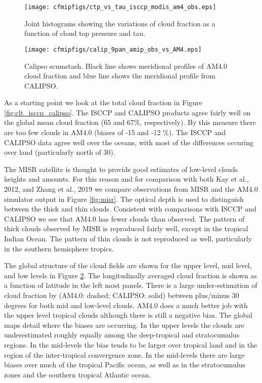 \documentclass[11pt]{article}   	%
\begin{document}
\begin{figure}
  \texttt{[image: cfmipfigs/ctp\_vs\_tau\_isccp\_modis\_am4\_obs.eps]}
  \caption{Joint histograms showing the variations of cloud fraction as a function of cloud top pressure and tau.}
  \label{fig:calipso_sim_vs_mod}
\end{figure}

\begin{figure}
  \texttt{[image: cfmipfigs/calip\_9pan\_amip\_obs\_vs\_AM4.eps]}
  \caption{Calipso scumstash.  Black line shows meridional profiles of AM4.0 cloud fraction and blue line shows
  the meridional profile from CALIPSO.}
  \label{fig:calipso_9pan}
\end{figure}


As a starting point we look at the total cloud fraction in Figure \ref{fig:clt_isccp_calipso}.  The ISCCP and 
CALIPSO products agree fairly well on the 
global mean cloud fraction (65 and 67\%, respectively).   By this measure there are too few clouds in AM4.0 
(biases of -15 and -12 \%).   The ISCCP and CALIPSO data agree well over the oceans, with most of the differences
occuring over land (particularly north of 30).    

The MISR satellite is thought to provide good estimates of low-level clouds heights and amounts.  For this reason
and for comparison with both Kay et al., 2012, and Zhang et al., 2019 we compare observations from MISR
and the AM4.0 simulator output in Figure \ref{fig:misr}.  The optical depth is used to distinguish
between the thick and thin clouds.  Consistent with comparisons with ISCCP and CALIPSO we see that AM4.0
has fewer clouds than observed.  The pattern of thick clouds observed by MISR is reproduced fairly well, except in 
the tropical Indian Ocean.  The pattern of thin clouds is not reproduced as well, particularly in the southern hemisphere 
tropics.   

The global structure of the cloud fields are shown for the upper level, mid level, and low levels in 
Figure \ref{fig:calipso_9pan}.  The longitudinally averaged cloud fraction is shown as a function of latitude in the 
left most panels.  There is a large under-estimation of cloud fraction by (AM4.0: dashed; CALIPSO: solid) between 
plus/minus 30 
degrees for both mid and low-level clouds.   AM4.0 does a much better job with the upper level tropical clouds 
although there is still a negative bias.   The global maps detail where the biases are occurring.  In the upper 
levels the clouds are underestimated roughly equally among the deep-tropical and stratocumulus regions.  In the
mid-levels the bias tends to be larger over tropical land and in the region of the inter-tropical convergence zone.  
In the mid-levels there are large biases over much of the tropical Pacific ocean, as well as in the stratocumulus
zones and the southern tropical Atlantic ocean.  
\end{document}

